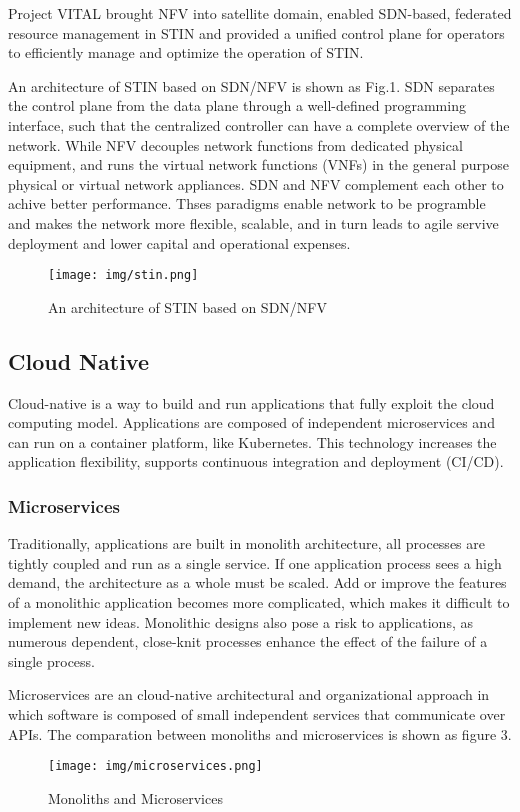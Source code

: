 \documentclass[12pt, draftclsnofoot, onecolumn]{IEEEtran}
\begin{document}
Project VITAL \cite{vital} brought NFV into satellite domain,  enabled SDN-based, federated resource management in STIN and provided a unified control plane for operators to efficiently manage and optimize the operation of STIN.

An architecture of STIN based on SDN/NFV is shown as Fig.1. SDN separates the control plane from the data plane through a well-defined programming interface, such that the centralized controller can have a complete overview of the network. While NFV decouples network functions from dedicated physical equipment, and runs the virtual network functions (VNFs) in the general purpose physical or virtual network appliances.  SDN and NFV complement each other to achive better performance. Thses paradigms enable network to be programble and makes the network more flexible, scalable, and in turn leads to agile servive deployment and lower capital and operational expenses.
\begin{figure}[H] 	
	\centering 	
	\texttt{[image: img/stin.png]} 	\caption{An architecture of STIN based on SDN/NFV} 
\end{figure}



\subsection{Cloud Native}
Cloud-native\cite{cncf} is a way to build and run applications that fully exploit the cloud computing model. Applications are composed of independent microservices and can run on a container platform, like Kubernetes. This technology increases the application flexibility, supports continuous integration and deployment (CI/CD).
\subsubsection{Microservices}
Traditionally, applications are built in monolith architecture, all processes are tightly coupled and run as a single service. If one application process sees a high demand, the architecture as a whole must be scaled. Add or improve the features of a monolithic application becomes more complicated, which makes it difficult to implement new ideas. Monolithic designs also pose a risk to applications, as numerous dependent, close-knit processes enhance the effect of the failure of a single process.

Microservices are an cloud-native architectural and organizational approach in which software is composed of small independent services that communicate over APIs. The comparation between monoliths and microservices is shown as figure 3.
\begin{figure}[H]
	\centering
	\texttt{[image: img/microservices.png]}
	\caption{ Monoliths and Microservices}
\end{figure}
\end{document}

